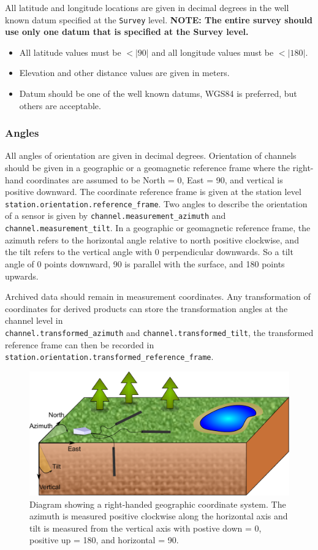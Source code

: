 \documentclass[12pt]{article}
\begin{document}
All latitude and longitude locations are given in decimal degrees in the well known datum specified at the \verb|Survey| level. \textbf{NOTE: The entire survey should use only one datum that is specified at the Survey level.}

\begin{itemize}
	\setlength\itemsep{0em}
	\item All latitude values must be $<|90|$ and all longitude values must be $<|180|$.
	\item Elevation and other distance values are given in meters.
	\item Datum should be one of the well known datums, WGS84 is preferred, but others are acceptable.
\end{itemize} 

\subsubsection{Angles}

All angles of orientation are given in decimal degrees.  Orientation of channels should be given in a geographic or a geomagnetic reference frame where the right-hand coordinates are assumed to be North = 0, East = 90, and vertical is positive downward.  The coordinate reference frame is given at the station level \verb|station.orientation.reference_frame|.  Two angles to describe the orientation of a sensor is given by \verb|channel.measurement_azimuth| and \verb|channel.measurement_tilt|.  In a geographic or geomagnetic reference frame, the azimuth refers to the horizontal angle relative to north positive clockwise, and the tilt refers to the vertical angle with 0 perpendicular downwards.  So a tilt angle of 0 points downward, 90 is parallel with the surface, and 180 points upwards.  

Archived data should remain in measurement coordinates. Any transformation of coordinates for derived products can store the transformation angles at the channel level in \\ \verb|channel.transformed_azimuth| and \verb|channel.transformed_tilt|, the transformed reference frame can then be recorded in \verb|station.orientation.transformed_reference_frame|.      

\begin{figure}[!h]
	\centering
	\includegraphics[width=.85\textwidth]{reference_frame.pdf}
	\caption{Diagram showing a right-handed geographic coordinate system.  The azimuth is measured positive clockwise along the horizontal axis and tilt is measured from the vertical axis with postive down = 0, positive up = 180, and horizontal = 90.}
	\label{fig:reference}
\end{figure}  
\end{document}
